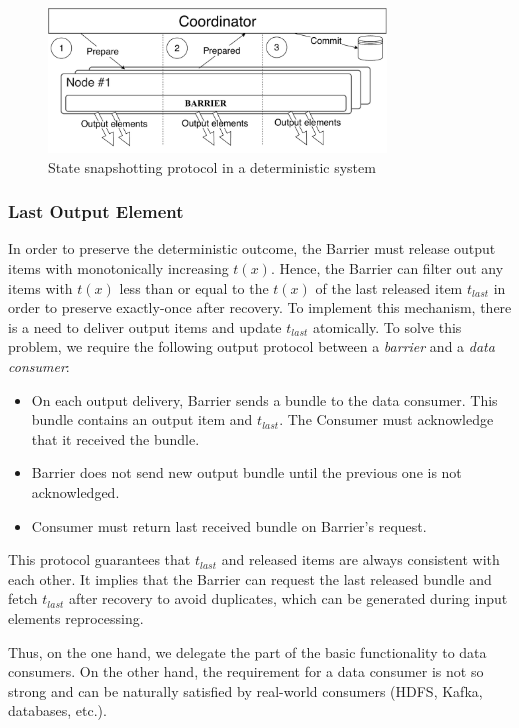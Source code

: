 \begin{figure}[t]
  \centering
  \includegraphics[width=0.8\textwidth]{Chapters/DeterministicModelRuntime/pics/protocol-fs.pdf}
  \caption{State snapshotting protocol in a deterministic system}
  \label{protocol_fs}
\end{figure}

\subsubsection{Last Output Element}

In order to preserve the deterministic outcome, the Barrier must release output items with monotonically increasing $t(x)$. Hence, the Barrier can filter out any items with $t(x)$ less than or equal to the $t(x)$ of the last released item $t_{last}$ in order to preserve exactly-once after recovery. To implement this mechanism, there is a need to deliver output items and update $t_{last}$ atomically. To solve this problem, we require the following output protocol between a {\em barrier} and a {\em data consumer}: 

\begin{itemize}
    \item On each output delivery, Barrier sends a bundle to the data consumer. This bundle contains an output item and $t_{last}$. The Consumer must acknowledge that it received the bundle.
    \item Barrier does not send new output bundle until the previous one is not acknowledged.
    \item Consumer must return last received bundle on Barrier's request.
\end{itemize}

This protocol guarantees that $t_{last}$ and released items are always consistent with each other. It implies that the Barrier can request the last released bundle and fetch $t_{last}$ after recovery to avoid duplicates, which can be generated during input elements reprocessing.

Thus, on the one hand, we delegate the part of the basic functionality to data consumers. On the other hand, the requirement for a data consumer is not so strong and can be naturally satisfied by real-world consumers (HDFS, Kafka, databases, etc.). 

